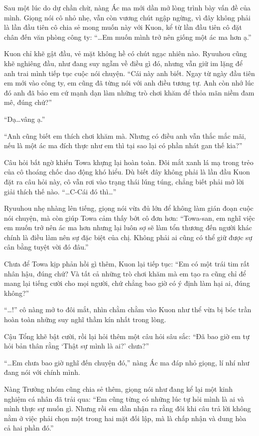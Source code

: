 \documentclass[../main.tex]{subfiles}
\begin{document}
Sau một lúc do dự chần chừ, nàng Ác ma mới dần mở lòng trình bày vấn đề của mình. Giọng nói cô nhỏ nhẹ, vẫn còn vương chút ngập ngừng, vì đây không phải là lần đầu tiên cô chia sẻ mong muốn này với Kuon, kể từ lần đầu tiên cô đặt chân đến văn phòng công ty: ``\dots Em muốn mình trở nên giống một ác ma hơn ạ.''

Kuon chỉ khẽ gật đầu, vẻ mặt không hề có chút ngạc nhiên nào. Ryuuhou cũng khẽ nghiêng đầu, như đang suy ngẫm về điều gì đó, nhưng vẫn giữ im lặng để anh trai mình tiếp tục cuộc nói chuyện. ``Cái này anh biết. Ngay từ ngày đầu tiên em mới vào công ty, em cũng đã từng nói với anh điều tương tự. Anh còn nhớ lúc đó anh đã bảo em cứ mạnh dạn làm những trò chơi khăm để thỏa mãn niềm đam mê, đúng chứ?''

``Dạ\dots vâng ạ.''

``Anh cũng biết em thích chơi khăm mà. Nhưng có điều anh vẫn thắc mắc mãi, nếu là một ác ma đích thực như em thì tại sao lại có phần nhát gan thế kia?''

Câu hỏi bất ngờ khiến Towa khựng lại hoàn toàn. Đôi mắt xanh lá mạ trong trẻo của cô thoáng chốc dao động khó hiểu. Dù biết đây không phải là lần đầu Kuon đặt ra câu hỏi này, cô vẫn rơi vào trạng thái lúng túng, chẳng biết phải mở lời giải thích thế nào. ``\dots C-Cái đó thì\dots''

Ryuuhou nhẹ nhàng lên tiếng, giọng nói vừa đủ lớn để không làm gián đoạn cuộc nói chuyện, mà còn giúp Towa cảm thấy bớt cô đơn hơn: ``Towa-san, em nghĩ việc em muốn trở nên ác ma hơn nhưng lại luôn sợ sẽ làm tổn thương đến người khác chính là điều làm nên sự đặc biệt của chị. Không phải ai cũng có thể giữ được sự cân bằng tuyệt vời đó đâu.''

Chưa để Towa kịp phản hồi gì thêm, Kuon lại tiếp tục: ``Em có một trái tim rất nhân hậu, đúng chứ? Và tất cả những trò chơi khăm mà em tạo ra cũng chỉ để mang lại tiếng cười cho mọi người, chứ chẳng bao giờ có ý định làm hại ai, đúng không?''

``\dots!'' cô nàng mở to đôi mắt, nhìn chằm chằm vào Kuon như thể vừa bị bóc trần hoàn toàn những suy nghĩ thầm kín nhất trong lòng.

Cậu Tổng khẽ bật cười, rồi lại hỏi thêm một câu hỏi sâu sắc: ``Đã bao giờ em tự hỏi bản thân rằng `Thật sự mình là ai?' chưa?''

``\dots Em chưa bao giờ nghĩ đến chuyện đó,'' nàng Ác ma đáp nhỏ giọng, lí nhí như đang nói với chính mình.

Nàng Trưởng nhóm cũng chia sẻ thêm, giọng nói như đang kể lại một kinh nghiệm cá nhân đã trải qua: ``Em cũng từng có những lúc tự hỏi mình là ai và mình thực sự muốn gì. Nhưng rồi em dần nhận ra rằng đôi khi câu trả lời không nằm ở việc phải chọn một trong hai mặt đối lập, mà là chấp nhận và dung hòa cả hai phần đó.''
\end{document}
